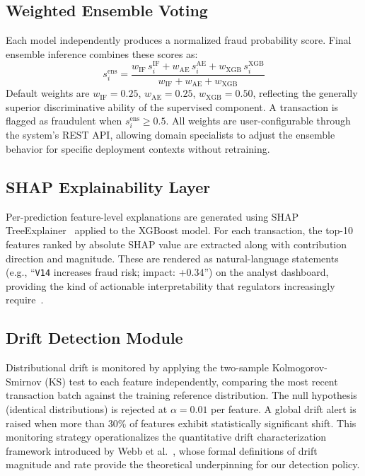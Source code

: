 \documentclass[conference,10pt]{IEEEtran}
\begin{document}
\subsection{Weighted Ensemble Voting}
Each model independently produces a normalized fraud probability score. Final ensemble inference combines these scores as:
\begin{equation}
  s_i^{\text{ens}} = \frac{w_{\text{IF}}\,s_i^{\text{IF}} + w_{\text{AE}}\,s_i^{\text{AE}} + w_{\text{XGB}}\,s_i^{\text{XGB}}}{w_{\text{IF}} + w_{\text{AE}} + w_{\text{XGB}}} \label{eq:ens}
\end{equation}
Default weights are $w_{\text{IF}} = 0.25$, $w_{\text{AE}} = 0.25$, $w_{\text{XGB}} = 0.50$, reflecting the generally superior discriminative ability of the supervised component. A transaction is flagged as fraudulent when $s_i^{\text{ens}} \geq 0.5$. All weights are user-configurable through the system's REST API, allowing domain specialists to adjust the ensemble behavior for specific deployment contexts without retraining.

\subsection{SHAP Explainability Layer}
Per-prediction feature-level explanations are generated using SHAP TreeExplainer~\cite{lundberg2017unified} applied to the XGBoost model. For each transaction, the top-10 features ranked by absolute SHAP value are extracted along with contribution direction and magnitude. These are rendered as natural-language statements (e.g., ``\texttt{V14} increases fraud risk; impact: +0.34'') on the analyst dashboard, providing the kind of actionable interpretability that regulators increasingly require~\cite{eu2016gdpr}.

\subsection{Drift Detection Module}
Distributional drift is monitored by applying the two-sample Kolmogorov-Smirnov (KS) test to each feature independently, comparing the most recent transaction batch against the training reference distribution. The null hypothesis (identical distributions) is rejected at $\alpha = 0.01$ per feature. A global drift alert is raised when more than 30\% of features exhibit statistically significant shift. This monitoring strategy operationalizes the quantitative drift characterization framework introduced by Webb et al.~\cite{webb2016characterizing}, whose formal definitions of drift magnitude and rate provide the theoretical underpinning for our detection policy.
\end{document}
